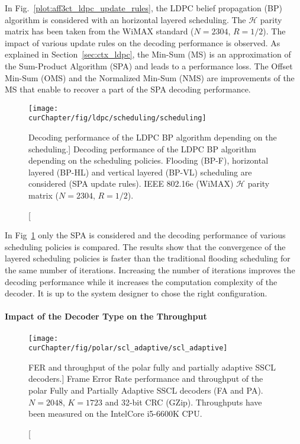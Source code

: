 In Fig.~\ref{plot:aff3ct_ldpc_update_rules}, the LDPC belief propagation (BP)
algorithm is considered with an horizontal layered scheduling. The $\mathcal{H}$
parity matrix has been taken from the WiMAX standard ($N=2304$, $R=1/2$). The
impact of various update rules on the decoding performance is observed. As
explained in Section~\ref{sec:ctx_ldpc}, the Min-Sum (MS) is an approximation of
the Sum-Product Algorithm (SPA) and leads to a performance loss. The Offset
Min-Sum (OMS) and the Normalized Min-Sum (NMS) are improvements of the MS that
enable to recover a part of the SPA decoding performance.

\begin{figure}[htp]
  \centering
  \texttt{[image: \\curChapter/fig/ldpc/scheduling/scheduling]}
  \caption
    [Decoding performance of the LDPC BP algorithm depending on the scheduling.]
    {Decoding performance of the LDPC BP algorithm depending on the scheduling
     policies. Flooding (BP-F), horizontal layered (BP-HL) and vertical layered
     (BP-VL) scheduling are considered (SPA update rules). IEEE 802.16e (WiMAX)
     $\mathcal{H}$ parity matrix ($N=2304$, $R=1/2$).}
  \label{plot:aff3ct_ldpc_scheduling}
\end{figure}

In Fig~\ref{plot:aff3ct_ldpc_scheduling} only the SPA is considered
and the decoding performance of various scheduling policies is compared. The
results show that the convergence of the layered scheduling policies is faster
than the traditional flooding scheduling for the same number of iterations.
Increasing the number of iterations improves the decoding performance while it
increases the computation complexity of the decoder. It is up to the system
designer to chose the right configuration.

\paragraph{Impact of the Decoder Type on the Throughput}

\begin{figure}[htp]
  \centering
  \texttt{[image: \\curChapter/fig/polar/scl\_adaptive/scl\_adaptive]}
  \caption
    [FER and throughput of the polar fully and partially adaptive SSCL
     decoders.]
    {Frame Error Rate performance and throughput of the polar Fully and
     Partially Adaptive SSCL decoders (FA and PA). $N = 2048$, $K = 1723$ and
     32-bit CRC (GZip). Throughputs have been measured on the Intel\R Core\TM
     i5-6600K CPU.}
  \label{plot:aff3ct_polar_scl_adaptive}
\end{figure}

